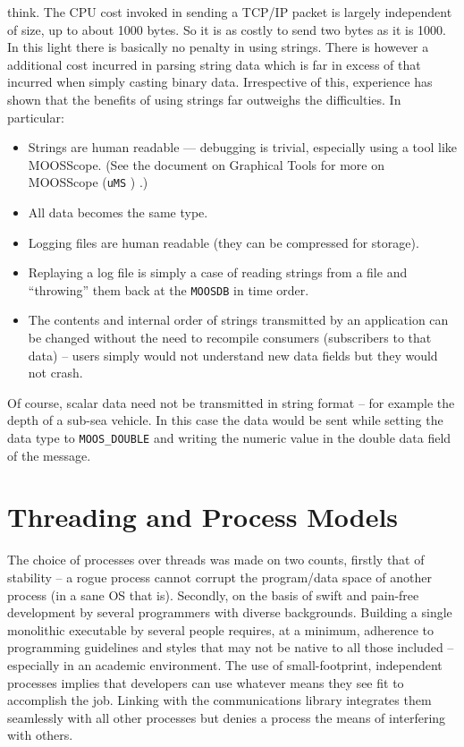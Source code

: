 \documentclass[a4paper,10pt]{article}
\newcommand{\Code}[1]{\texttt{#1} }
\newcommand{\code}[1]{\Code{#1} }
\newcommand{\DB}   {\code{{MOOSDB}}}
\begin{document}
think. The CPU cost invoked in sending a TCP/IP packet is largely
independent of size, up to about 1000 bytes. So it is as
costly to send two bytes as it is 1000. In this light
there is basically no penalty in using strings. There is however a
additional cost incurred in parsing string data which is far in
excess of that incurred when simply casting binary data.
Irrespective of this, experience has shown that the benefits of
using strings far outweighs the difficulties. In particular:
\begin{itemize}
\item Strings are human readable --- debugging is trivial, especially
using a tool like MOOSScope. (See the document on Graphical Tools for more on MOOSScope (\code{uMS}) .)
\item All data becomes the same type.
\item Logging files are human readable (they can be compressed for
storage).
\item Replaying a log file is simply a case of reading strings from
a file and ``throwing'' them back at the \DB in time order.
\item The contents and internal order of strings transmitted by an application can be changed
without the need to recompile consumers (subscribers to that data)
-- users simply would not understand new data fields but they would
not crash.
\end{itemize}
Of course, scalar data need not be transmitted in string format --
for example the depth of a sub-sea vehicle. In this case the data
would be sent while setting the data type to  \verb"MOOS_DOUBLE"
and writing the numeric value in the double data field of the
message.

\section{Threading and Process Models}
The choice of processes over threads was made on two counts,
firstly that of stability -- a rogue process cannot corrupt the
program/data space of another process (in a sane OS that is).
Secondly, on the basis of swift and pain-free development by
several programmers with diverse backgrounds. Building a single
monolithic executable by several people requires, at a minimum,
adherence to programming guidelines and styles that may not be
native to all those included -- especially in an academic
environment. The use of small-footprint, independent processes
implies that developers can use whatever means they see fit to
accomplish the job. Linking with the communications library
integrates them seamlessly with all other processes but denies a
process the means of interfering with others.
\end{document}
